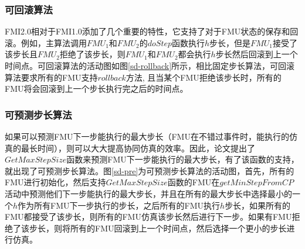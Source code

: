 \subsubsection{可回滚算法}
FMI2.0相对于FMI1.0添加了几个重要的特性，它支持了对于FMU状态的保存和回滚。例如，主算法调用$FMU_{1}$和$FMU_{2}$的$doStep$函数执行$h$步长，但是$FMU_{1}$接受了该步长且$FMU_{2}$拒绝了该步长，则$FMU_{1}$和$FMU_{2}$都会执行$h$步长然后回滚到上一个时间点。可回滚算法的活动图如图\ref{sd-rollback}所示，相比固定步长算法，可回滚算法要求所有的FMU支持$rollback$方法, 且当某个FMU拒绝该步长时，所有的FMU将会回滚到上一个步长执行完之后的时间点。
\subsubsection{可预测步长算法}
如果可以预测FMU下一步能执行的最大步长（FMU在不错过事件时，能执行的仿真的最长时间），则可以大大提高协同仿真的效率。因此，论文\cite{BromanBGLMTW13}提出了$GetMaxStepSize$函数来预测FMU下一步能执行的最大步长，有了该函数的支持，就出现了可预测步长算法。图\ref{sd-pre}为可预测步长算法的活动图，首先，所有的FMU进行初始化，然后支持$GetMaxStepSize$函数的FMU在$getMinStepFromCP$活动中预测他们下一步能执行的最大步长，并且在所有的最大步长中选择最小的一个$h$作为所有FMU下一步执行的步长，之后所有的FMU执行$h$步长，如果所有的FMU都接受了该步长，则所有的FMU仿真该步长然后进行下一步。如果有FMU拒绝了该步长，则将所有的FMU回滚到上一个时间点，然后选择一个更小的步长进行仿真。

